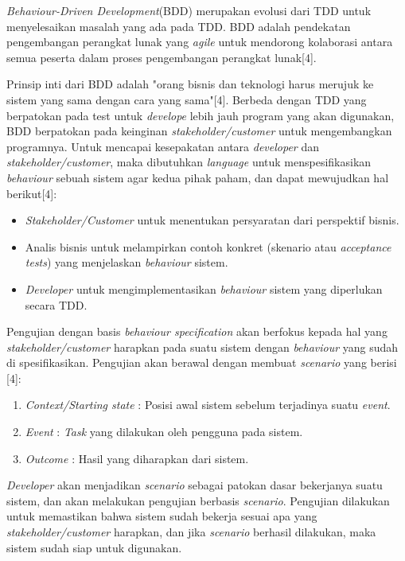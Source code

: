 \textit{Behaviour-Driven Development}(BDD) merupakan evolusi dari TDD untuk menyelesaikan masalah yang ada pada TDD. BDD adalah pendekatan pengembangan perangkat lunak yang \textit{agile} untuk mendorong kolaborasi antara semua peserta dalam proses pengembangan perangkat lunak[4].

Prinsip inti dari BDD adalah "orang bisnis dan teknologi harus merujuk ke sistem yang sama dengan cara yang sama"[4]. Berbeda dengan TDD yang berpatokan pada test untuk \textit{develope} lebih jauh program yang akan digunakan, BDD berpatokan pada keinginan \textit{stakeholder/customer} untuk mengembangkan programnya. Untuk mencapai kesepakatan antara \textit{developer} dan \textit{stakeholder/customer}, maka dibutuhkan \textit{language} untuk menspesifikasikan \textit{behaviour} sebuah sistem agar kedua pihak paham, dan dapat mewujudkan hal berikut[4]:
\begin{itemize}
\item \textit{Stakeholder/Customer} untuk menentukan persyaratan dari perspektif bisnis.
\item Analis bisnis untuk melampirkan contoh konkret (skenario atau \textit{acceptance tests}) yang menjelaskan \textit{behaviour} sistem.
\item \textit{Developer} untuk mengimplementasikan \textit{behaviour} sistem yang diperlukan secara TDD.
\end{itemize}
	
Pengujian dengan basis \textit{behaviour specification} akan berfokus kepada hal yang \textit{stakeholder/customer} harapkan pada suatu sistem dengan \textit{behaviour} yang sudah di spesifikasikan. Pengujian akan berawal dengan membuat \textit{scenario} yang berisi [4]:
\begin{enumerate}
\item \textit{Context/Starting state} : Posisi awal sistem sebelum terjadinya suatu \textit{event}.
\item \textit{Event} : \textit{Task} yang dilakukan oleh pengguna pada sistem.
\item \textit{Outcome} : Hasil yang diharapkan dari sistem.
\end{enumerate}
\textit{Developer} akan menjadikan \textit{scenario} sebagai patokan dasar bekerjanya suatu sistem, dan akan melakukan pengujian berbasis \textit{scenario}. Pengujian dilakukan untuk memastikan bahwa sistem sudah bekerja sesuai apa yang \textit{stakeholder/customer} harapkan, dan jika \textit{scenario} berhasil dilakukan, maka sistem sudah siap untuk digunakan. 

